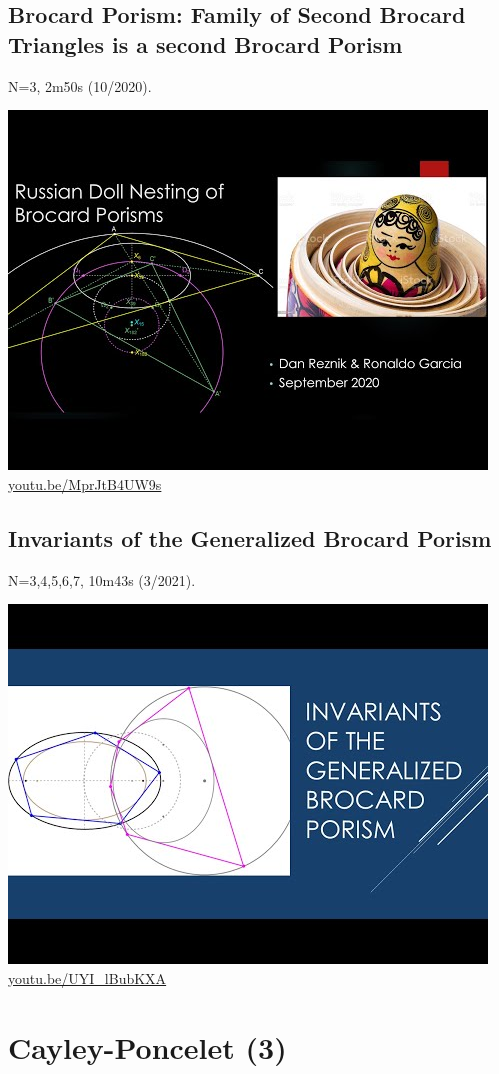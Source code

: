 \documentclass[12pt]{amsart}
\begin{document}
\subsection{Brocard Porism: Family of Second Brocard Triangles is a second Brocard Porism}
\label{vid:MprJtB4UW9s}
\noindent N=3, 2m50s (10/2020). 
\begin{center}\includegraphics[width=.5\textwidth]{pics/MprJtB4UW9s.jpg} \\ 
\href{https://youtu.be/MprJtB4UW9s}{\url{youtu.be/MprJtB4UW9s}}\end{center}
% 
\subsection{Invariants of the Generalized Brocard Porism}
\label{vid:UYI_lBubKXA}
\noindent N=3,4,5,6,7, 10m43s (3/2021). 
\begin{center}\includegraphics[width=.5\textwidth]{pics/UYI_lBubKXA.jpg} \\ 
\href{https://youtu.be/UYI_lBubKXA}{\url{youtu.be/UYI\_lBubKXA}}\end{center}
% 

\section{Cayley-Poncelet (3)}
\end{document}
